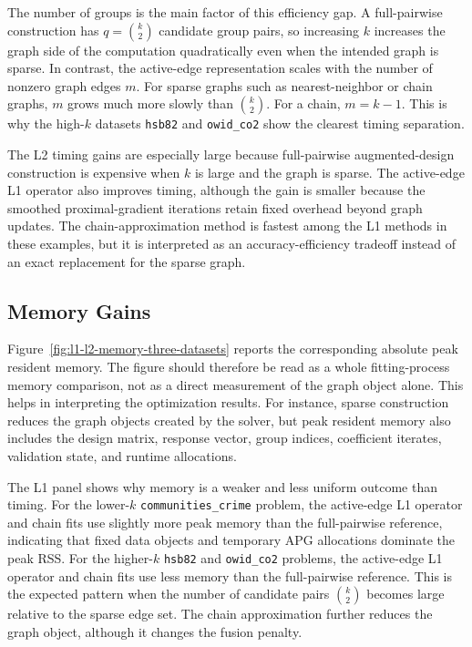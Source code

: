 \documentclass[twoside,11pt]{article}
\begin{document}
The number of groups is the main factor of this efficiency gap. 
A full-pairwise construction has $q=\binom{k}{2}$ candidate group pairs, so increasing $k$ increases the graph side of the computation quadratically even when the intended graph is sparse. 
In contrast, the active-edge representation scales with the number of nonzero graph edges $m$. 
For sparse graphs such as nearest-neighbor or chain graphs, $m$ grows much more slowly than $\binom{k}{2}$. For a chain, $m=k-1$. 
This is why the high-$k$ datasets \texttt{hsb82} and \texttt{owid\_co2} show the clearest timing separation.

The L2 timing gains are especially large because full-pairwise augmented-design construction is expensive when $k$ is large and the graph is sparse.
The active-edge L1 operator also improves timing, although the gain is smaller because the smoothed proximal-gradient iterations retain fixed overhead beyond graph updates. 
The chain-approximation method is fastest among the L1 methods in these examples, but it is interpreted as an accuracy-efficiency tradeoff instead of an exact replacement for the sparse graph.


\subsection{Memory Gains}

Figure~\ref{fig:l1-l2-memory-three-datasets} reports the corresponding absolute peak resident memory. 
The figure should therefore be read as a whole fitting-process memory comparison, not as a direct measurement of the graph object alone. 
This helps in interpreting the optimization results. 
For instance, sparse construction reduces the graph objects created by the solver, but peak resident memory also includes the design matrix, response vector, group indices, coefficient iterates, validation state, and runtime allocations.

The L1 panel shows why memory is a weaker and less uniform outcome than timing.
For the lower-$k$ \texttt{communities\_crime} problem, the active-edge L1 operator and chain fits use slightly more peak memory than the full-pairwise reference, indicating that fixed data objects and temporary APG allocations dominate the peak RSS. 
For the higher-$k$ \texttt{hsb82} and \texttt{owid\_co2} problems, the active-edge L1 operator and chain fits use less memory than the full-pairwise reference.
This is the expected pattern when the number of candidate pairs $\binom{k}{2}$ becomes large relative to the sparse edge set.
The chain approximation further reduces the graph object, although it changes the fusion penalty.
\end{document}

